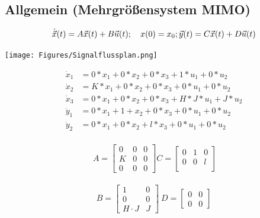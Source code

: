 \documentclass[10pt,a4paper]{article}
\begin{document}
  \subsection{Allgemein (Mehrgrößensystem MIMO) }
  \begin{mdframed}[style=exercise]
    \begin{equation}
      \dot{\Vec{x}}(t) = A\vec{x}(t) + B\vec{u}(t); \quad x(0) = x_{0}; \\*
      \vec{y}(t) = C\vec{x}(t) + D\vec{u}(t)
    \end{equation}
  \end{mdframed}
  \begin{center}
    \texttt{[image: Figures/Signalflussplan.png]}
  \end{center}
  \begin{mdframed}[style=exercise]
    \begin{align*}
      \dot{x}_{1} &= 0*x_{1} +0*x_{2} +0*x_{3} +1*u_{1}+0*u_{2} \\
      \dot{x}_{2} &= K*x_{1} +0*x_{2} +0*x_{3} +0*u_{1}+0*u_{2} \\
      \dot{x}_{3} &= 0*x_{1} +0*x_{2} +0*x_{3} +H*J*u_{1}+J*u_{2} \\
      \dot{y}_{1} &= 0*x_{1} +1+x_{2} +0*x_{3} +0*u_{1}+0*u_{2} \\
      \dot{y}_{2} &= 0*x_{1} +0*x_{2} +l*x_{3} +0*u_{1}+0*u_{2} \\
    \end{align*}
  \end{mdframed}

  \begin{mdframed}[style=exercise]
   \[
        \ A = \begin{bmatrix}
            0&0&0\\
            K&0&0\\
            0&0&0
        \end{bmatrix}
        C = \begin{bmatrix}
            0&1&0\\
            0&0&l\\
        \end{bmatrix}\]\\
        \[B = \begin{bmatrix}
            1&0\\
            0&0\\
            H\cdot{}J&J
        \end{bmatrix} \
        D = \begin{bmatrix}
            0&0\\
            0&0
        \end{bmatrix}\]

  \end{mdframed}
\end{document}
